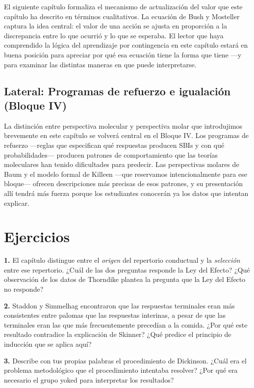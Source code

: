 \documentclass[
  letterpaper,
  DIV=11,
  numbers=noendperiod]{scrreprt}
\begin{document}
\begin{tcolorbox}[enhanced jigsaw, arc=.35mm, bottomrule=.15mm, breakable, colback=white, colframe=quarto-callout-note-color-frame, left=2mm, leftrule=.75mm, opacityback=0, rightrule=.15mm, toprule=.15mm]
El siguiente capítulo formaliza el mecanismo de actualización del valor
que este capítulo ha descrito en términos cualitativos. La ecuación de
Bush y Mosteller captura la idea central: el valor de una acción se
ajusta en proporción a la discrepancia entre lo que ocurrió y lo que se
esperaba. El lector que haya comprendido la lógica del aprendizaje por
contingencia en este capítulo estará en buena posición para apreciar por
qué esa ecuación tiene la forma que tiene ---y para examinar las
distintas maneras en que puede interpretarse.

\subsection{Lateral: Programas de refuerzo e igualación (Bloque
IV)}\label{lateral-programas-de-refuerzo-e-igualaciuxf3n-bloque-iv}

La distinción entre perspectiva molecular y perspectiva molar que
introdujimos brevemente en este capítulo se volverá central en el Bloque
IV. Los programas de refuerzo ---reglas que especifican qué respuestas
producen SBIs y con qué probabilidades--- producen patrones de
comportamiento que las teorías moleculares han tenido dificultades para
predecir. Las perspectivas molares de Baum y el modelo formal de Killeen
---que reservamos intencionalmente para ese bloque--- ofrecen
descripciones más precisas de esos patrones, y su presentación allí
tendrá más fuerza porque los estudiantes conocerán ya los datos que
intentan explicar.

\section{Ejercicios}\label{ejercicios-1}

\textbf{1.} El capítulo distingue entre el \emph{origen} del repertorio
conductual y la \emph{selección} entre ese repertorio. ¿Cuál de las dos
preguntas responde la Ley del Efecto? ¿Qué observación de los datos de
Thorndike plantea la pregunta que la Ley del Efecto no responde?

\textbf{2.} Staddon y Simmelhag encontraron que las respuestas
terminales eran más consistentes entre palomas que las respuestas
interinas, a pesar de que las terminales eran las que más frecuentemente
precedían a la comida. ¿Por qué este resultado contradice la explicación
de Skinner? ¿Qué predice el principio de inducción que se aplica aquí?

\textbf{3.} Describe con tus propias palabras el procedimiento de
Dickinson. ¿Cuál era el problema metodológico que el procedimiento
intentaba resolver? ¿Por qué era necesario el grupo yoked para
interpretar los resultados?


\end{tcolorbox}
\end{document}
